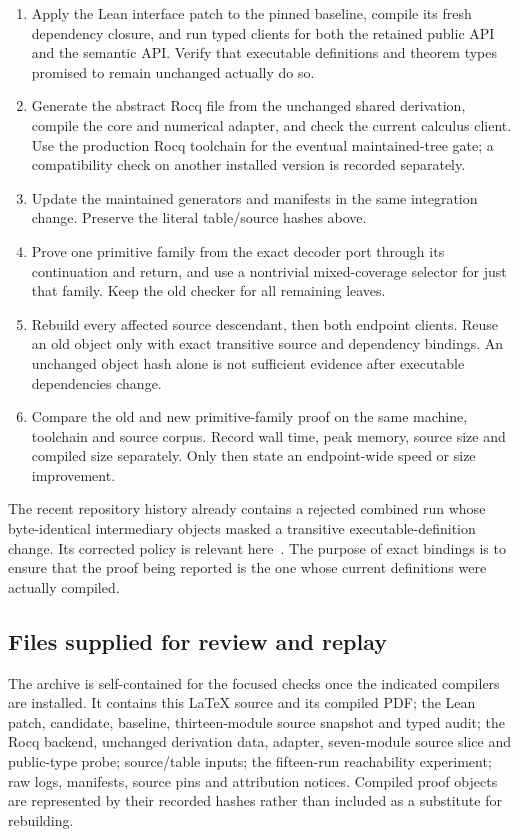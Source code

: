 \documentclass[11pt]{article}
\begin{document}
\begin{enumerate}
\item Apply the Lean interface patch to the pinned baseline, compile its fresh dependency closure, and run typed clients for both the retained public API and the semantic API. Verify that executable definitions and theorem types promised to remain unchanged actually do so.
\item Generate the abstract Rocq file from the unchanged shared derivation, compile the core and numerical adapter, and check the current calculus client. Use the production Rocq toolchain for the eventual maintained-tree gate; a compatibility check on another installed version is recorded separately.
\item Update the maintained generators and manifests in the same integration change. Preserve the literal table/source hashes above.
\item Prove one primitive family from the exact decoder port through its continuation and return, and use a nontrivial mixed-coverage selector for just that family. Keep the old checker for all remaining leaves.
\item Rebuild every affected source descendant, then both endpoint clients. Reuse an old object only with exact transitive source and dependency bindings. An unchanged object hash alone is not sufficient evidence after executable dependencies change.
\item Compare the old and new primitive-family proof on the same machine, toolchain and source corpus. Record wall time, peak memory, source size and compiled size separately. Only then state an endpoint-wide speed or size improvement.
\end{enumerate}

The recent repository history already contains a rejected combined run whose byte-identical intermediary objects masked a transitive executable-definition change. Its corrected policy is relevant here~\cite{phase9}. The purpose of exact bindings is to ensure that the proof being reported is the one whose current definitions were actually compiled.

\subsection{Files supplied for review and replay}

The archive is self-contained for the focused checks once the indicated compilers are installed. It contains this \LaTeX{} source and its compiled PDF; the Lean patch, candidate, baseline, thirteen-module source snapshot and typed audit; the Rocq backend, unchanged derivation data, adapter, seven-module source slice and public-type probe; source/table inputs; the fifteen-run reachability experiment; raw logs, manifests, source pins and attribution notices. Compiled proof objects are represented by their recorded hashes rather than included as a substitute for rebuilding.
\end{document}
